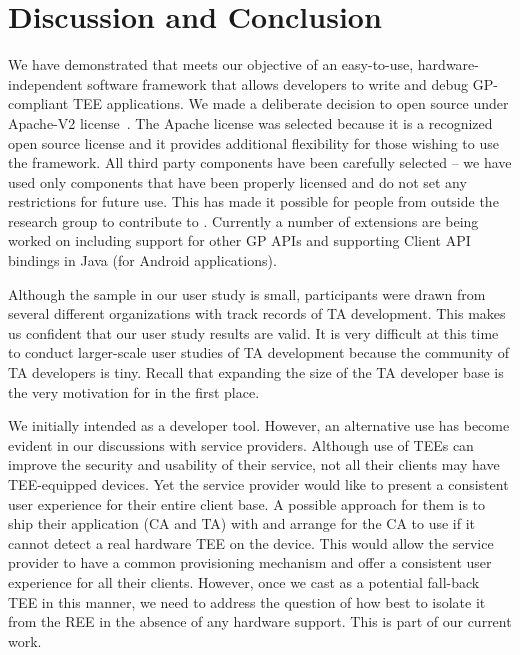 \documentclass[10pt,conference,letterpaper]{IEEEtran}
\newcommand{\opentee}{\protect{TEE-Vi}\xspace}
\newcommand{\opentee}{\protect{Open-TEE}\xspace}
\begin{document}
\section{Discussion and Conclusion}

We have demonstrated that \opentee meets our objective of an easy-to-use, hardware-independent software framework that allows developers to write and debug GP-compliant TEE applications. We made a deliberate decision to open source \opentee under Apache-V2 license~\cite{web:Apache-v2}. The Apache license was selected because it is a recognized open source license and it provides additional flexibility for those wishing to use the framework. All third party components have been carefully selected -- we have used only components that have been properly licensed and do not set any restrictions for future use. This has made it possible for people from outside the research group to contribute to \opentee. Currently a number of extensions are being worked on including support for other GP APIs and supporting Client API bindings in Java (for Android applications).

Although the sample in our user study is small, participants were drawn from several different organizations with track records of TA development. This makes us confident that our user study results are valid. It is very difficult at this time to conduct larger-scale user studies of TA development because the community of TA developers is tiny. Recall that expanding the size of the TA developer base is the very motivation for \opentee in the first place.

We initially intended \opentee as a developer tool. However, an alternative use has become evident in our discussions with service providers. Although use of TEEs can improve the security and usability of their service, not all their clients may have TEE-equipped devices. Yet the service provider would like to present a consistent user experience for their entire client base. A possible approach for them is to ship their application (CA and TA) with \opentee and arrange for the CA to use \opentee if it cannot detect a real hardware TEE on the device. This would allow the service provider to have a common provisioning mechanism and offer a consistent user experience for all their clients. However, once we cast \opentee as a potential fall-back TEE in this manner, we need to address the question of how best to isolate it from the REE in the absence of any hardware support. This is part of our current work.
\end{document}

